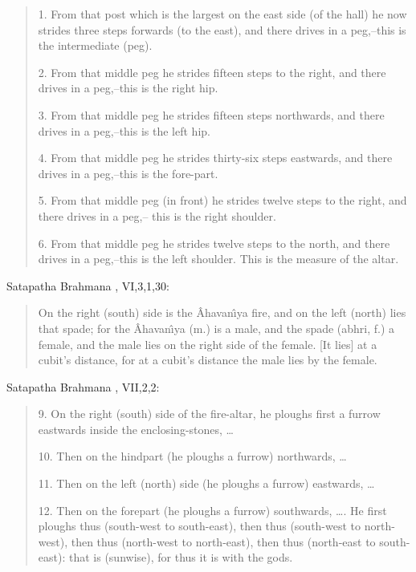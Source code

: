 \documentclass{article}
\begin{document}
\begin{quote}
1. From that post which is the largest on the east side (of the hall) he now
strides three steps forwards (to the east), and there drives in a peg,--this is the intermediate (peg).

2. From that middle peg he strides fifteen steps to the right, and there drives in a peg,--this is the
right hip.

3. From that middle peg he strides fifteen steps
northwards, and there drives in a peg,--this is the left hip.

4. From that middle peg he strides thirty-six steps eastwards, and there drives in a peg,--this is
the fore-part.

5. From that middle peg (in front) he strides twelve steps to the right, and there drives in a peg,--
this is the right shoulder.

6. From that middle peg he strides twelve steps to the north, and there drives in a peg,--this is the 
left shoulder. This is the measure of the altar.
\end{quote}

Satapatha Brahmana \cite[p.~199]{eggelingIII}, VI,3,1,30:

\begin{quote}
On the right (south) side is the \^Ahavan{\^\i}ya
fire, and on the left (north) lies that spade; for the 
\^Ahavan{\^\i}ya (m.) is a male, and the spade (abhri, f.)
a female, and the male lies on the right side of the female. [It lies] at a cubit's distance, for at a
cubit's distance the male lies by the female.
\end{quote}

Satapatha Brahmana \cite[pp.~327--329]{eggelingIII}, VII,2,2:

\begin{quote}
9. On the right (south) side of the fire-altar, he ploughs first a furrow eastwards inside the enclosing-stones, \ldots

10. Then on the hindpart (he ploughs a furrow) northwards, \ldots

11. Then on the left (north) side (he ploughs a furrow) eastwards, \ldots

12. Then on the forepart (he ploughs a furrow) southwards, \ldots. He first ploughs thus (south-west to
south-east), then thus (south-west to north-west), then thus (north-west to north-east), then thus (north-east to
south-east): that is (sunwise), for thus it is with the gods.
\end{quote}
\end{document}
